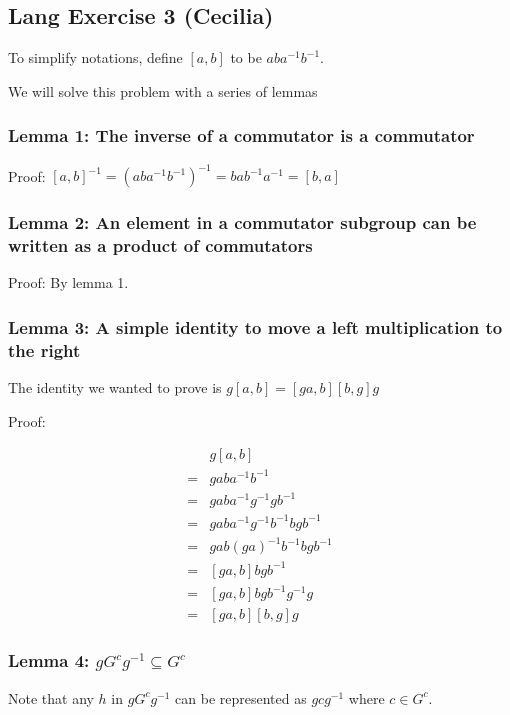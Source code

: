 \subsection*{Lang Exercise 3 (Cecilia)}

To simplify notations, define $[a ,b]$ to be $aba^{-1}b^{-1}$.

We will solve this problem with a series of lemmas

\subsubsection*{Lemma 1: The inverse of a commutator is a commutator}

Proof: $[a, b]^{-1} = (aba^{-1}b^{-1})^{-1} = bab^{-1}a^{-1} = [b, a] $

\subsubsection*{Lemma 2: An element in a commutator subgroup can be written as a product of commutators}

Proof: By lemma 1.

\subsubsection*{Lemma 3: A simple identity to move a left multiplication to the right}

The identity we wanted to prove is $g[a,b] = [ga,b][b,g]g $

Proof: 

\begin{align*}
   &g[a,b] \\
  =& gaba^{-1}b^{-1} \\
  =& gaba^{-1}g^{-1}gb^{-1} \\
  =& gaba^{-1}g^{-1}b^{-1}bgb^{-1} \\
  =& gab(ga)^{-1}b^{-1}bgb^{-1} \\
  =& [ga,b]bgb^{-1} \\
  =& [ga,b]bgb^{-1}g^{-1}g \\
  =& [ga,b][b,g]g
\end{align*}

\subsubsection*{Lemma 4: $ gG^cg^{-1} \subseteq G^c $}

Note that any $h$ in $gG^cg^{-1}$ can be represented as $gcg^{-1}$ where $ c \in G^c$.

